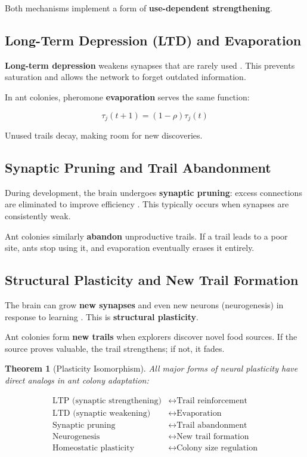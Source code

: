 \documentclass[12pt,letterpaper]{article}
\newtheorem{theorem}{Theorem}[section]
\begin{document}
Both mechanisms implement a form of \textbf{use-dependent strengthening}.

\subsection{Long-Term Depression (LTD) and Evaporation}

\textbf{Long-term depression} weakens synapses that are rarely used \citep{ito1989long}. This prevents saturation and allows the network to forget outdated information.

In ant colonies, pheromone \textbf{evaporation} serves the same function:

\begin{equation}
\tau_j(t+1) = (1-\rho)\tau_j(t) \label{eq:evaporation}
\end{equation}

Unused trails decay, making room for new discoveries.

\subsection{Synaptic Pruning and Trail Abandonment}

During development, the brain undergoes \textbf{synaptic pruning}: excess connections are eliminated to improve efficiency \citep{changeux1975genetic}. This typically occurs when synapses are consistently weak.

Ant colonies similarly \textbf{abandon} unproductive trails. If a trail leads to a poor site, ants stop using it, and evaporation eventually erases it entirely.

\subsection{Structural Plasticity and New Trail Formation}

The brain can grow \textbf{new synapses} and even new neurons (neurogenesis) in response to learning \citep{eriksson1998neurogenesis}. This is \textbf{structural plasticity}.

Ant colonies form \textbf{new trails} when explorers discover novel food sources. If the source proves valuable, the trail strengthens; if not, it fades.

\begin{theorem}[Plasticity Isomorphism]
All major forms of neural plasticity have direct analogs in ant colony adaptation:

\begin{align*}
\text{LTP (synaptic strengthening)} &\longleftrightarrow \text{Trail reinforcement} \\
\text{LTD (synaptic weakening)} &\longleftrightarrow \text{Evaporation} \\
\text{Synaptic pruning} &\longleftrightarrow \text{Trail abandonment} \\
\text{Neurogenesis} &\longleftrightarrow \text{New trail formation} \\
\text{Homeostatic plasticity} &\longleftrightarrow \text{Colony size regulation}
\end{align*}
\end{theorem}
\end{document}

